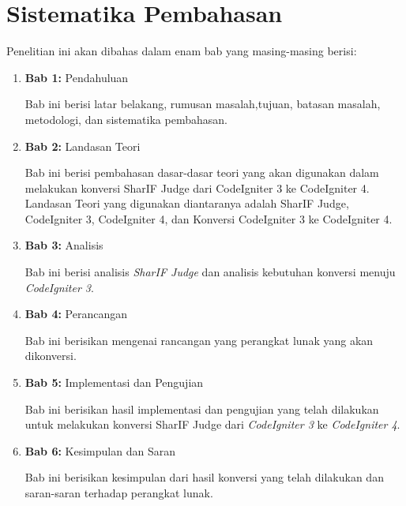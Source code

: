 \section{Sistematika Pembahasan}
\label{sec:sispem}
Penelitian ini akan dibahas dalam enam bab yang masing-masing berisi:
\begin{enumerate}
	\item \textbf{Bab 1:} Pendahuluan
	
	Bab ini berisi latar belakang, rumusan masalah,tujuan, batasan masalah, metodologi, dan sistematika pembahasan.
	\item \textbf{Bab 2:} Landasan Teori
	
	Bab ini berisi pembahasan dasar-dasar teori yang akan digunakan dalam melakukan konversi SharIF Judge dari CodeIgniter 3 ke CodeIgniter 4. Landasan Teori yang digunakan diantaranya adalah SharIF Judge, CodeIgniter 3, CodeIgniter 4, dan Konversi CodeIgniter 3 ke CodeIgniter 4.
	\item \textbf{Bab 3:} Analisis
	
	Bab ini berisi analisis \textit{SharIF Judge} dan analisis kebutuhan konversi menuju \textit{CodeIgniter 3}.
	\item \textbf{Bab 4:} Perancangan
	
	Bab ini berisikan mengenai rancangan yang perangkat lunak yang akan dikonversi.
	\item \textbf{Bab 5:} Implementasi dan Pengujian
	
	Bab ini berisikan hasil implementasi dan pengujian yang telah dilakukan untuk melakukan konversi SharIF Judge dari \textit{CodeIgniter 3} ke \textit{CodeIgniter 4}.
	\item \textbf{Bab 6:} Kesimpulan dan Saran
	
	Bab ini berisikan kesimpulan dari hasil konversi yang telah dilakukan dan saran-saran terhadap perangkat lunak.
\end{enumerate}
